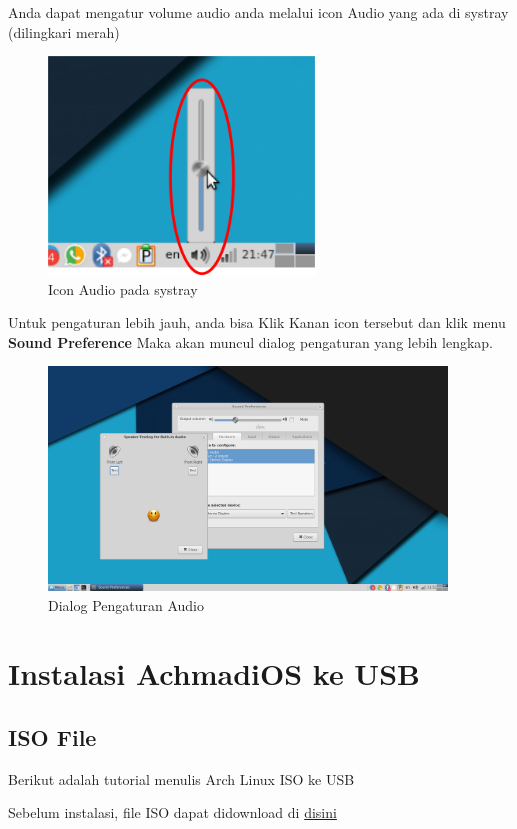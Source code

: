 \documentclass[12pt,]{article}
\begin{document}
	Anda dapat mengatur volume audio anda melalui icon Audio yang ada di systray (dilingkari merah)
	
	\begin{figure}[!ht]
		\centering
		\includegraphics[width=200pt]{png/systrayaudio}
		\caption{Icon Audio pada systray}
	\end{figure}

	Untuk pengaturan lebih jauh, anda bisa Klik Kanan icon tersebut dan klik menu \textbf{Sound Preference}
	Maka akan muncul dialog pengaturan yang lebih lengkap.
	
	\begin{figure}[!ht]
		\centering
		\includegraphics[width=300pt]{png/audiodlg}
		\caption{Dialog Pengaturan Audio}
	\end{figure}
	
	\newpage
	\section{Instalasi AchmadiOS ke USB}
	
	\subsection{ISO File}
	Berikut adalah tutorial menulis Arch Linux ISO ke USB
	
	Sebelum instalasi, file ISO dapat didownload di \href{https://drive.google.com/open?id=0B1r9uekKJ7Z0ellkTVdmdUdYQmM}{disini}
	 
\end{document}
